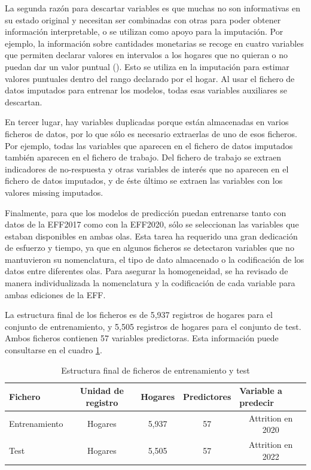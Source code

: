 La segunda razón para descartar variables es que muchas no son informativas en su estado original y necesitan ser combinadas con otras para poder obtener información interpretable, o se utilizan como apoyo para la imputación. Por ejemplo, la información sobre cantidades monetarias se recoge en cuatro variables que permiten declarar valores en intervalos a los hogares que no quieran o no puedan dar un valor puntual (\cite{effmethod2017}). Esto se utiliza en la imputación para estimar valores puntuales dentro del rango declarado por el hogar. Al usar el fichero de datos imputados para entrenar los modelos, todas esas variables auxiliares se descartan.

En tercer lugar, hay variables duplicadas porque están almacenadas en varios ficheros de datos, por lo que sólo es necesario extraerlas de uno de esos ficheros. Por ejemplo, todas las variables que aparecen en el fichero de datos imputados también aparecen en el fichero de trabajo. Del fichero de trabajo se extraen indicadores de no-respuesta y otras variables de interés que no aparecen en el fichero de datos imputados, y de éste último se extraen las variables con los valores missing imputados.

Finalmente, para que los modelos de predicción puedan entrenarse tanto con datos de la EFF2017 como con la EFF2020, sólo se seleccionan las variables que estaban disponibles en ambas olas. Esta tarea ha requerido una gran dedicación de esfuerzo y tiempo, ya que en algunos ficheros se detectaron variables que no mantuvieron su nomenclatura, el tipo de dato almacenado o la codificación de los datos entre diferentes olas. Para asegurar la homogeneidad, se ha revisado de manera individualizada la nomenclatura y la codificación de cada variable para ambas ediciones de la EFF.

La estructura final de los ficheros es de 5,937 registros de hogares para el conjunto de entrenamiento, y 5,505 registros de hogares para el conjunto de test. Ambos ficheros contienen 57 variables predictoras. Esta información puede consultarse en el cuadro \ref{table:train_test_structure}.

\begin{table}[htbp]
\begin{tabular}{lcccc}
\textbf{Fichero} & \textbf{Unidad de registro} & \textbf{Hogares} & \textbf{Predictores} & \multicolumn{1}{l}{\textbf{Variable a predecir}} \\ \hline
Entrenamiento & Hogares & 5,937 & 57 & Attrition en 2020 \\
Test & Hogares & 5,505 & 57 & Attrition en 2022 \\ \hline
\end{tabular}
\caption{Estructura final de ficheros de entrenamiento y test}
\label{table:train_test_structure}
\end{table}

